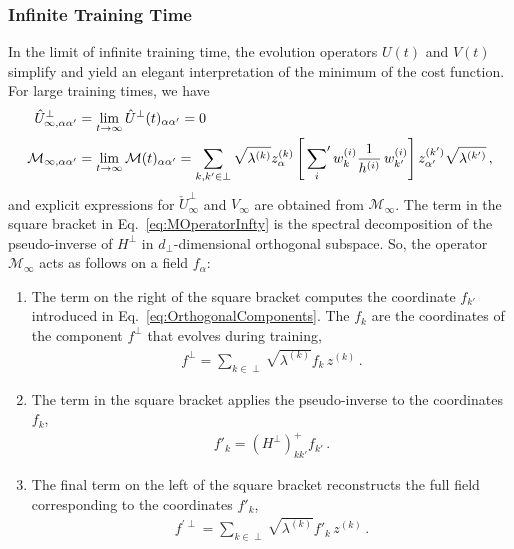 \subsubsection{Infinite Training Time}
In the limit of infinite training time, the evolution operators $U(t)$ and
$V(t)$ simplify and yield an elegant interpretation of the minimum of the cost
function. For large training times, we have
\begin{align}
    \label{eq:UhatInfty}
    \hat{U}^\perp_{\infty, \alpha\alpha'}
        &= \lim_{t\to\infty}\hat{U}^\perp(t)_{\alpha\alpha'} = 0\, \\
    \label{eq:MOperatorInfty}
    \mathcal{M}_{\infty, \alpha\alpha'} 
        &= \lim_{t\to\infty}\mathcal{M}(t)_{\alpha\alpha'} = \sum_{k,k'\in\perp} \sqrt{\lambda^{(k)}} z^{(k)}_\alpha 
        \left[\sideset{}{'}\sum_{i} w^{(i)}_{k} \frac{1}{h^{(i)}}\, 
        w^{(i)}_{k'}\right] z^{(k')}_{\alpha'} \sqrt{\lambda^{(k')}}\, ,
\end{align}
and explicit expressions for $\check{U}^\perp_{\infty}$ and $V_{\infty}$ are
obtained from $\mathcal{M}_{\infty}$. The term in the square bracket in
Eq.~\eqref{eq:MOperatorInfty} is the spectral decomposition of the pseudo-inverse
of $H^\perp$ in $d_\perp$-dimensional orthogonal subspace. So, the operator
$\mathcal{M}_{\infty}$ acts as follows on a field $f_{\alpha}$:
\begin{enumerate}
    \item The term on the right of the square bracket computes the coordinate
    $f_{k'}$ introduced in Eq.~\eqref{eq:OrthogonalComponents}. The $f_k$ are 
    the coordinates of the component $f^\perp$ that evolves during
    training, 
    \begin{align}
        \label{eq:RightOfTheBracket}
        f^\perp = \sum_{k\in\perp} \sqrt{\lambda^{(k)}} f_k\, z^{(k)}\,  .
    \end{align}
    \item The term in the square bracket applies the pseudo-inverse to the
    coordinates $f_k$, 
    \begin{align}
        \label{eq:ApplyPseudoInv}
        f'_k = \left(H^\perp\right)^+_{kk'} f_{k'}\, .
    \end{align}
    \item The final term on the left of the square bracket reconstructs the full
    field corresponding to the coordinates $f'_{k}$,
    \begin{align}
        \label{eq:LeftOfTheBracket}
        f^{'\perp} = \sum_{k\in\perp} \sqrt{\lambda^{(k)}} f'_{k}\, z^{(k)}\, .
    \end{align}
    
\end{enumerate}

